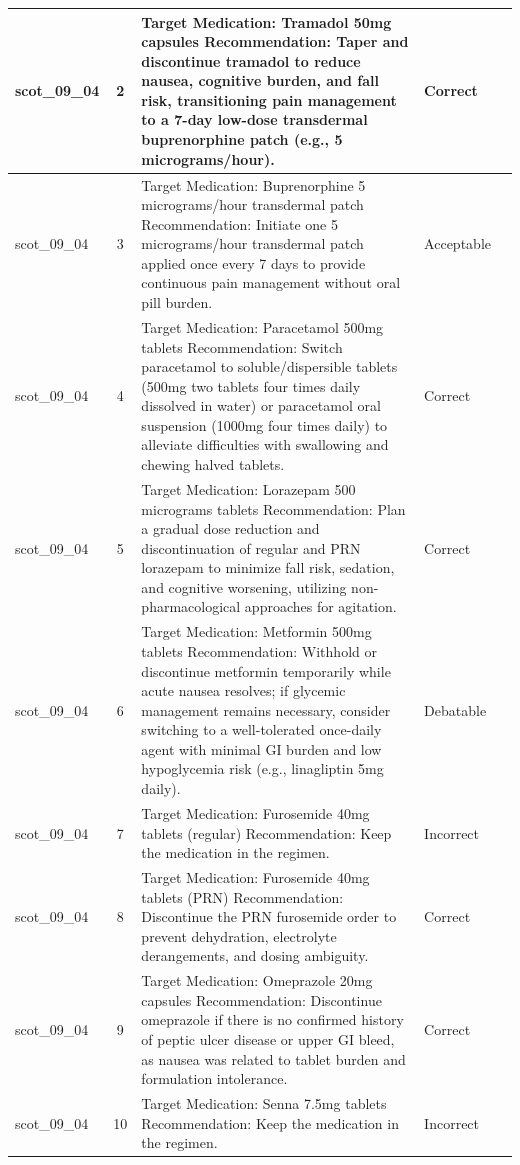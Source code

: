 \begin{longtable}{|p{1.45cm}|c|p{10.2cm}|p{1.55cm}|p{2.3cm}|}
\hline
scot\_09\_04 & 2 & Target Medication: Tramadol 50mg capsules Recommendation: Taper and discontinue tramadol to reduce nausea, cognitive burden, and fall risk, transitioning pain management to a 7-day low-dose transdermal buprenorphine patch (e.g., 5 micrograms/hour). & Correct &  \\
\hline
scot\_09\_04 & 3 & Target Medication: Buprenorphine 5 micrograms/hour transdermal patch Recommendation: Initiate one 5 micrograms/hour transdermal patch applied once every 7 days to provide continuous pain management without oral pill burden. & Acceptable &  \\
\hline
scot\_09\_04 & 4 & Target Medication: Paracetamol 500mg tablets Recommendation: Switch paracetamol to soluble/dispersible tablets (500mg two tablets four times daily dissolved in water) or paracetamol oral suspension (1000mg four times daily) to alleviate difficulties with swallowing and chewing halved tablets. & Correct &  \\
\hline
scot\_09\_04 & 5 & Target Medication: Lorazepam 500 micrograms tablets Recommendation: Plan a gradual dose reduction and discontinuation of regular and PRN lorazepam to minimize fall risk, sedation, and cognitive worsening, utilizing non-pharmacological approaches for agitation. & Correct &  \\
\hline
scot\_09\_04 & 6 & Target Medication: Metformin 500mg tablets Recommendation: Withhold or discontinue metformin temporarily while acute nausea resolves; if glycemic management remains necessary, consider switching to a well-tolerated once-daily agent with minimal GI burden and low hypoglycemia risk (e.g., linagliptin 5mg daily). & Debatable &  \\
\hline
scot\_09\_04 & 7 & Target Medication: Furosemide 40mg tablets (regular) Recommendation: Keep the medication in the regimen. & Incorrect &  \\
\hline
scot\_09\_04 & 8 & Target Medication: Furosemide 40mg tablets (PRN) Recommendation: Discontinue the PRN furosemide order to prevent dehydration, electrolyte derangements, and dosing ambiguity. & Correct &  \\
\hline
scot\_09\_04 & 9 & Target Medication: Omeprazole 20mg capsules Recommendation: Discontinue omeprazole if there is no confirmed history of peptic ulcer disease or upper GI bleed, as nausea was related to tablet burden and formulation intolerance. & Correct &  \\
\hline
scot\_09\_04 & 10 & Target Medication: Senna 7.5mg tablets Recommendation: Keep the medication in the regimen. & Incorrect &  \\

\end{longtable}
